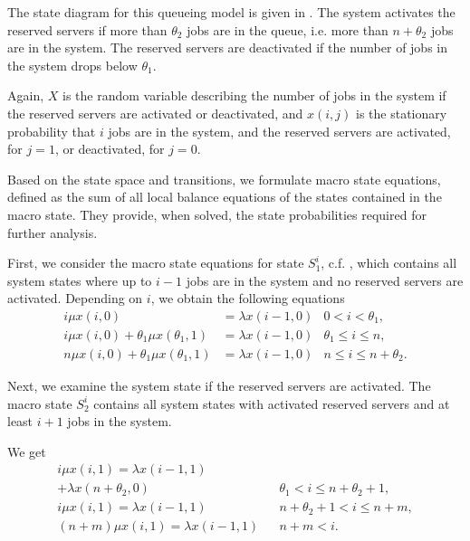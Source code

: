 The state diagram for this queueing model is given in .
The system activates the reserved servers if more than \(\theta_2\) jobs are in the queue, i.e. more than \(n + \theta_2\) jobs are in the system.
The reserved servers are deactivated if the number of jobs in the system drops below \(\theta_1\).

Again, \(X\) is the random variable describing the number of jobs in the system if the reserved servers are activated or deactivated, and \(x(i, j)\) is the stationary probability that \(i\) jobs are in the system, and the reserved servers are activated, for \(j=1\), or deactivated, for \(j=0\). 

Based on the state space and transitions, we formulate macro state equations, defined as the sum of all local balance equations of the states contained in the macro state.
They provide, when solved, the state probabilities required for further analysis. 

First,  we consider the macro state equations for state \(S_1^i\), c.f. , which contains all system states where up to \(i-1\) jobs are in the system and no reserved servers are activated.
Depending on \(i\), we obtain the following equations
\begin{align}
i\mu x(i,0) &= \lambda x(i-1, 0) & 0<i<\theta_1,\label{eq:cloud:data_centers:modeling:energy_efficient:S1_1}\\
i\mu x(i,0) + \theta_1 \mu x(\theta_1,1) &= \lambda x(i-1,0) & \theta_1\leq i\leq n,\label{eq:cloud:data_centers:modeling:energy_efficient:S1_2}\\
n\mu x(i,0) + \theta_1 \mu x(\theta_1,1) &= \lambda x(i-1,0) & n\leq i\leq n+\theta_2.\label{eq:cloud:data_centers:modeling:energy_efficient:S1_3}
\end{align}

Next, we examine the system state if the reserved servers are activated.
The macro state \(S_2^i\) contains all system states with activated reserved servers and at least \(i+1\) jobs in the system.

We get
\begin{align}
i\mu x(i,1) = \lambda x(i-1,1)\nonumber\\
 + \lambda x(n+\theta_2,0) && \theta_1<i\leq n+\theta_2+1,\label{eq:cloud:data_centers:modeling:energy_efficient:S2_1}\\
 i\mu x(i,1) = \lambda  x(i-1,1) && n+\theta_2+1<i\leq n+m,\label{eq:cloud:data_centers:modeling:energy_efficient:S2_2}\\
 (n+m)\mu x(i,1) =\lambda x(i-1,1) && n+m<i.\label{eq:cloud:data_centers:modeling:energy_efficient:S2_3}
\end{align}

